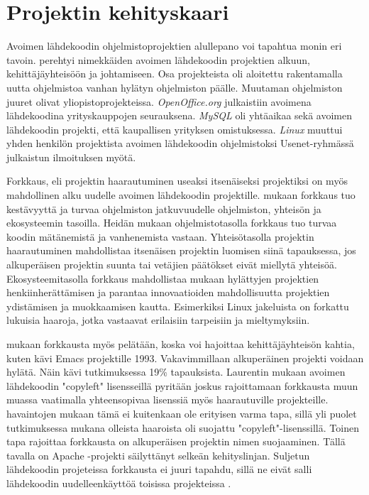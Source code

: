 \documentclass[utf8]{gradu3}
\begin{document}
\section{Projektin kehityskaari}
Avoimen lähdekoodin ohjelmistoprojektien alullepano voi tapahtua monin eri
tavoin. \textcite{Conlon-2007} perehtyi nimekkäiden avoimen lähdekoodin
projektien alkuun, kehittäjäyhteisöön ja johtamiseen. Osa projekteista oli
aloitettu rakentamalla uutta ohjelmistoa vanhan hylätyn ohjelmiston päälle.
Muutaman ohjelmiston juuret olivat yliopistoprojekteissa.
\textit{OpenOffice.org} julkaistiin avoimena lähdekoodina yrityskauppojen
seurauksena. \textit{MySQL} oli yhtäaikaa sekä avoimen lähdekoodin projekti,
että kaupallisen yrityksen omistuksessa. \textit{Linux} muuttui yhden henkilön
projektista avoimen lähdekoodin ohjelmistoksi Usenet-ryhmässä julkaistun
ilmoituksen myötä. \parencite{Conlon-2007}

Forkkaus, eli projektin haarautuminen useaksi itsenäiseksi projektiksi on myös
mahdollinen alku uudelle avoimen lähdekoodin projektille. \textcite{Nyman-2013}
mukaan forkkaus tuo kestävyyttä ja turvaa ohjelmiston jatkuvuudelle ohjelmiston,
yhteisön ja ekosysteemin tasoilla. Heidän mukaan ohjelmistotasolla forkkaus tuo
turvaa koodin mätänemistä ja vanhenemista vastaan. Yhteisötasolla projektin
haarautuminen mahdollistaa itsenäisen projektin luomisen siinä tapauksessa, jos
alkuperäisen projektin suunta tai vetäjien päätökset eivät miellytä yhteisöä.
Ekosysteemitasolla forkkaus mahdollistaa \textcite{Nyman-2013} mukaan hylättyjen
projektien henkiinherättämisen ja parantaa innovaatioiden mahdollisuutta
projektien ydistämisen ja muokkaamisen kautta. Esimerkiksi Linux jakeluista on
forkattu lukuisia haaroja, jotka vastaavat erilaisiin tarpeisiin ja
mieltymyksiin.

\textcite{Laurent-2004} mukaan forkkausta myös pelätään, koska voi hajoittaa
kehittäjäyhteisön kahtia, kuten kävi Emacs projektille 1993. Vakavimmillaan
alkuperäinen projekti voidaan hylätä. Näin kävi \textcite{Viseur-2012}
tutkimuksessa 19\% tapauksista. Laurentin mukaan avoimen lähdekoodin "copyleft"
lisensseillä pyritään joskus rajoittamaan forkkausta muun muassa vaatimalla
yhteensopivaa lisenssiä myös haarautuville projekteille. \textcite{Viseur-2012}
havaintojen mukaan tämä ei kuitenkaan ole erityisen varma tapa, sillä yli puolet
tutkimuksessa mukana olleista haaroista oli suojattu "copyleft"-lisenssillä.
Toinen tapa rajoittaa forkkausta on alkuperäisen projektin nimen suojaaminen.
Tällä tavalla on Apache -projekti säilyttänyt selkeän kehityslinjan. Suljetun
lähdekoodin projeteissa forkkausta ei juuri tapahdu, sillä ne eivät salli
lähdekoodin uudelleenkäyttöä toisissa projekteissa \parencite{Conlon-2007}.
\end{document}
